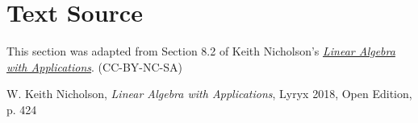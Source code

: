\documentclass{ximera}
\begin{document}

\section*{Text Source} This section was adapted from Section 8.2 of Keith Nicholson's \href{https://open.umn.edu/opentextbooks/textbooks/linear-algebra-with-applications}{\it Linear Algebra with Applications}. (CC-BY-NC-SA)

W. Keith Nicholson, {\it Linear Algebra with Applications}, Lyryx 2018, Open Edition, p. 424
\end{document}
